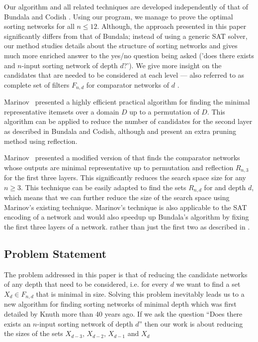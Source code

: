 \documentclass[13pt,a4paper]{article}
\begin{document}
Our algorithm and all related techniques are developed independently of that of Bundala \cite{BundalaCCSZ14_Optimal_Depth} and Codish \cite{CodishCS14:Two_Layer_Prefix} \cite{CodishCS14a_The_End_Game}. Using our program, we manage to prove the optimal sorting networks for all $n \leq 12$. Although, the approach presented in this paper significantly differs from that of Bundala; instead of using a generic SAT solver, our method studies details about the structure of sorting networks and gives much more enriched answer to the yes/no question being asked ('does there exists and $n$-input sorting network of depth $d$?'). We give more insight on the candidates that are needed to be considered at each level --- also referred to as complete set of filters $F_{n, d}$ for comparator networks of $d$ \cite{Marinov:SortingNetworks:ThirdLevel}.

Marinov~\cite{Marinov:ExtremalSets:Permutation} presented a highly efficient practical algorithm for finding the minimal representative itemsets over a domain $D$ up to a permutation of $D$. This algorithm can be applied to reduce the number of candidates for the second layer as described in Bundala and Codish, although \cite{BundalaCCSZ14_Optimal_Depth} and \cite{CodishCS14:Two_Layer_Prefix} present an extra pruning method using reflection.

Marinov~\cite{Marinov:SortingNetworks:ThirdLevel} presented a modified version of \cite{Marinov:ExtremalSets:Permutation} that finds the comparator networks whose outputs are minimal representative up to permutation and reflection $R_{n, 3}$ for the first three layers. This significantly reduces the search space size for any $n \geq 3$. This technique can be easily adapted to find the sets $R_{n, d}$ for and depth $d$, which means that we can further reduce the size of the search space using Marinov's existing technique. Marinov's technique is also applicable to the SAT encoding of a network and would also speedup up Bundala's algorithm by fixing the first three layers of a network. rather than just the first two as described in \cite{BundalaCCSZ14_Optimal_Depth}.


\subsection{ Problem Statement }

The problem addressed in this paper is that of reducing the candidate networks of any depth that need to be considered, i.e. for every $d$ we want to find a set $X_d \in F_{n, d}$ that is minimal in size. Solving this problem inevitably leads us to a new algorithm for finding sorting networks of minimal depth which was first detailed by Knuth \cite{Knuth73} more than 40 years ago. If we ask the question ``Does there exists an $n$-input sorting network of depth $d$'' then our work is about reducing the sizes of the sets $X_{d-3}$, $X_{d-2}$, $X_{d-1}$ and $X_{d}$
\end{document}
